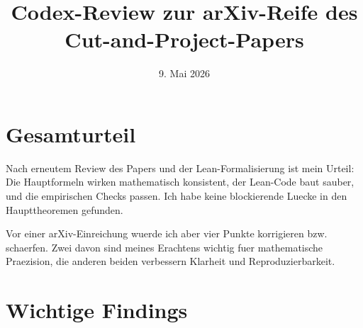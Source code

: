 \documentclass[11pt]{article}
\title{Codex-Review zur arXiv-Reife des Cut-and-Project-Papers}
\author{}
\date{9. Mai 2026}
\begin{document}
\maketitle

\section*{Gesamturteil}

Nach erneutem Review des Papers und der Lean-Formalisierung ist mein Urteil:
Die Hauptformeln wirken mathematisch konsistent, der Lean-Code baut sauber,
und die empirischen Checks passen. Ich habe keine blockierende Luecke in den
Haupttheoremen gefunden.

Vor einer arXiv-Einreichung wuerde ich aber vier Punkte korrigieren bzw.
schaerfen. Zwei davon sind meines Erachtens wichtig fuer mathematische
Praezision, die anderen beiden verbessern Klarheit und Reproduzierbarkeit.

\section*{Wichtige Findings}
\end{document}
